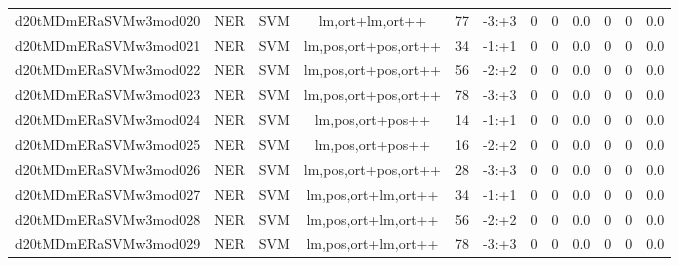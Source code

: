 \documentclass[a4paper]{article}
\begin{document}
\begin{landscape}
\begin{center}
\begin{tabular}{ |c|c|c|c|c|c|c|c|c|c|c|c|}
 
 	
 	\small{ d20tMDmERaSVMw3mod020 } & \small{ NER} & \small{  SVM }  & lm,ort+lm,ort++  &  77 &  \small{  -3:+3 }  &  0 & 0 & 0.0  &  0 & 0 & 0.0 \\
 	

 
 	
 	\small{ d20tMDmERaSVMw3mod021 } & \small{ NER} & \small{  SVM }  & lm,pos,ort+pos,ort++  &  34 &  \small{  -1:+1 }  &  0 & 0 & 0.0  &  0 & 0 & 0.0 \\
 	

 
 	
 	\small{ d20tMDmERaSVMw3mod022 } & \small{ NER} & \small{  SVM }  & lm,pos,ort+pos,ort++  &  56 &  \small{  -2:+2 }  &  0 & 0 & 0.0  &  0 & 0 & 0.0 \\
 	

 
 	
 	\small{ d20tMDmERaSVMw3mod023 } & \small{ NER} & \small{  SVM }  & lm,pos,ort+pos,ort++  &  78 &  \small{  -3:+3 }  &  0 & 0 & 0.0  &  0 & 0 & 0.0 \\
 	

 
 	
 	\small{ d20tMDmERaSVMw3mod024 } & \small{ NER} & \small{  SVM }  & lm,pos,ort+pos++  &  14 &  \small{  -1:+1 }  &  0 & 0 & 0.0  &  0 & 0 & 0.0 \\
 	

 
 	
 	\small{ d20tMDmERaSVMw3mod025 } & \small{ NER} & \small{  SVM }  & lm,pos,ort+pos++  &  16 &  \small{  -2:+2 }  &  0 & 0 & 0.0  &  0 & 0 & 0.0 \\
 	

 
 	
 	\small{ d20tMDmERaSVMw3mod026 } & \small{ NER} & \small{  SVM }  & lm,pos,ort+pos,ort++  &  28 &  \small{  -3:+3 }  &  0 & 0 & 0.0  &  0 & 0 & 0.0 \\
 	

 
 	
 	\small{ d20tMDmERaSVMw3mod027 } & \small{ NER} & \small{  SVM }  & lm,pos,ort+lm,ort++  &  34 &  \small{  -1:+1 }  &  0 & 0 & 0.0  &  0 & 0 & 0.0 \\
 	

 
 	
 	\small{ d20tMDmERaSVMw3mod028 } & \small{ NER} & \small{  SVM }  & lm,pos,ort+lm,ort++  &  56 &  \small{  -2:+2 }  &  0 & 0 & 0.0  &  0 & 0 & 0.0 \\
 	

 
 	
 	\small{ d20tMDmERaSVMw3mod029 } & \small{ NER} & \small{  SVM }  & lm,pos,ort+lm,ort++  &  78 &  \small{  -3:+3 }  &  0 & 0 & 0.0  &  0 & 0 & 0.0 \\
 	


\end{tabular}
\end{center}
\end{landscape}
\end{document}
